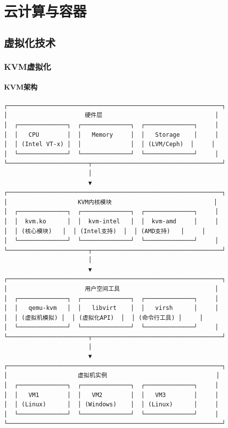 \documentclass[12pt,UTF8]{ctexbook}
\begin{document}
\part{云计算与容器}

\chapter{虚拟化技术}
\label{chap:virtualization}

\section{KVM虚拟化}
\label{sec:kvm}

\subsection*{KVM架构}

\begin{lstlisting}
┌─────────────────────────────────────────────────────────────┐
│                      硬件层                                │
│  ┌──────────────┐  ┌──────────────┐  ┌──────────────┐     │
│  │   CPU        │  │   Memory     │  │   Storage    │     │
│  │ (Intel VT-x) │  │              │  │ (LVM/Ceph)  │     │
│  └──────────────┘  └──────────────┘  └──────────────┘     │
└───────────────────────┬─────────────────────────────────────┘
                        │
                        ▼
┌─────────────────────────────────────────────────────────────┐
│                    KVM内核模块                             │
│  ┌──────────────┐  ┌──────────────┐  ┌──────────────┐     │
│  │  kvm.ko      │  │  kvm-intel   │  │  kvm-amd     │     │
│  │ (核心模块)   │  │ (Intel支持)  │  │ (AMD支持)   │     │
│  └──────────────┘  └──────────────┘  └──────────────┘     │
└───────────────────────┬─────────────────────────────────────┘
                        │
                        ▼
┌─────────────────────────────────────────────────────────────┐
│                      用户空间工具                           │
│  ┌──────────────┐  ┌──────────────┐  ┌──────────────┐     │
│  │   qemu-kvm   │  │   libvirt    │  │   virsh      │     │
│  │ (虚拟机模拟) │  │ (虚拟化API)  │  │ (命令行工具) │     │
│  └──────────────┘  └──────────────┘  └──────────────┘     │
└───────────────────────┬─────────────────────────────────────┘
                        │
                        ▼
┌─────────────────────────────────────────────────────────────┐
│                    虚拟机实例                               │
│  ┌──────────────┐  ┌──────────────┐  ┌──────────────┐     │
│  │   VM1        │  │   VM2        │  │   VM3        │     │
│  │ (Linux)      │  │ (Windows)    │  │ (Linux)      │     │
│  └──────────────┘  └──────────────┘  └──────────────┘     │
└─────────────────────────────────────────────────────────────┘
\end{lstlisting}
\end{document}
